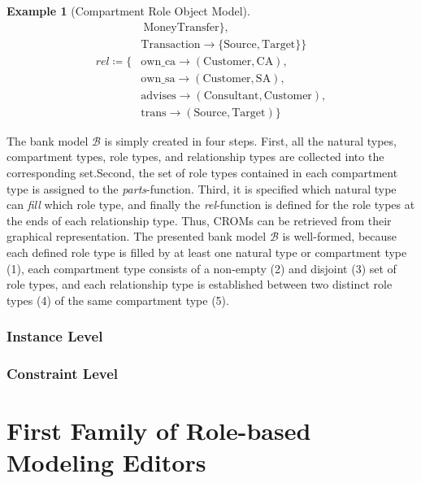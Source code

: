 \documentclass[english,ngerman,BCOR=6mm,cdgeometry=no,DIV=13,twoside,cdmath=false]{tudscrreprt}
\newtheorem{example}{Example} \usepackage{blindtext}
\begin{document}
\begin{example}[Compartment Role Object Model]
\begin{align*}
                                                        &\ \text{MoneyTransfer} \},\\
                                          & \text{Transaction} \rightarrow \{ \text{Source},\text{Target}\} \}\\
 \mathit{rel} \coloneqq \{ & \text{own\_ca} \rightarrow (\text{Customer},\text{CA}),\\
                           & \text{own\_sa} \rightarrow (\text{Customer},\text{SA}),\\
                           & \text{advises} \rightarrow (\text{Consultant},\text{Customer}),\\
                           & \text{trans} \rightarrow (\text{Source},\text{Target}) \}
\end{align*}
\end{example}

\noindent
The bank model $\mathcal{B}$ is simply created in four steps. First, all
the natural types, compartment types, role types, and relationship types
are collected into the corresponding set.\footnotemark[1]
 Second, the set of role types contained in each compartment type is
assigned to the \emph{parts}-function. Third, it is specified which
natural type can \emph{fill} which role type, and finally the
\emph{rel}-function is defined for the role types at the ends of each
relationship type. Thus, CROMs can be retrieved from their graphical
representation. The presented bank model $\mathcal{B}$ is well-formed,
because each defined role type is filled by at least one natural type or
compartment type (1), each compartment type consists of a non-empty (2)
and disjoint (3) set of role types, and each relationship type is
established between two distinct role types (4) of the same compartment
type (5).

\subsection{Instance Level}\label{instance-level}

\subsection{Constraint Level}\label{constraint-level}

\chapter{First Family of Role-based Modeling
Editors}\label{first-family-of-role-based-modeling-editors}
\end{document}

